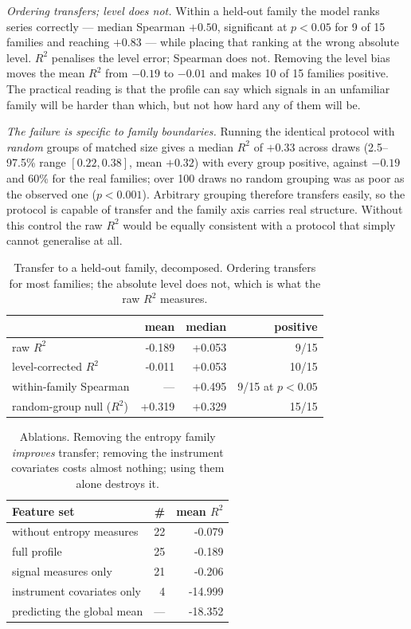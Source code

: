 \documentclass[11pt,a4paper]{article}
\newcommand{\num}[1]{#1}
\begin{document}
\emph{Ordering transfers; level does not.} Within a held-out family the model
ranks series correctly --- median Spearman \(+0.50\), significant at
\(p<0.05\) for \num{9} of \num{15} families and reaching \(+0.83\) --- while
placing that ranking at the wrong absolute level. \(R^2\) penalises the level
error; Spearman does not. Removing the level bias moves the mean \(R^2\) from
\(-0.19\) to \(-0.01\) and makes \num{10} of \num{15} families positive. The
practical reading is that the profile can say which signals in an unfamiliar
family will be harder than which, but not how hard any of them will be.

\emph{The failure is specific to family boundaries.} Running the identical
protocol with \emph{random} groups of matched size gives a median \(R^2\) of
\(+0.33\) across draws (2.5--97.5\% range \([0.22, 0.38]\), mean \(+0.32\))
with every group positive,
against \(-0.19\) and \num{60}\% for the real families; over \num{100} draws
no random grouping was as poor as the observed one (\(p<0.001\)). Arbitrary
grouping therefore transfers easily, so the protocol is capable of transfer and
the family axis carries real structure. Without this control the raw \(R^2\)
would be equally consistent with a protocol that simply cannot generalise at
all.

\begin{table}[t]
\centering
\caption{Transfer to a held-out family, decomposed. Ordering transfers for most
families; the absolute level does not, which is what the raw \(R^2\) measures.}
\label{tab:transfer}
\small
\begin{tabular}{lrrr}
\toprule
 & mean & median & positive \\
\midrule
raw \(R^2\)                 & \num{-0.189} & \num{+0.053} & 9/15 \\
level-corrected \(R^2\)     & \num{-0.011} & \num{+0.053} & 10/15 \\
within-family Spearman     & ---          & \num{+0.495} & 9/15 at \(p<0.05\) \\
\midrule
random-group null (\(R^2\)) & \num{+0.319} & \num{+0.329} & 15/15 \\
\bottomrule
\end{tabular}
\end{table}

\begin{table}[t]
\centering
\caption{Ablations. Removing the entropy family \emph{improves} transfer;
removing the instrument covariates costs almost nothing; using them alone
destroys it.}
\label{tab:ablation}
\small
\begin{tabular}{lrr}
\toprule
Feature set & \# & mean \(R^2\) \\
\midrule
without entropy measures   & 22 & \num{-0.079} \\
full profile               & 25 & \num{-0.189} \\
signal measures only       & 21 & \num{-0.206} \\
instrument covariates only & 4  & \num{-14.999} \\
\midrule
predicting the global mean & --- & \num{-18.352} \\
\bottomrule
\end{tabular}
\end{table}
\end{document}
